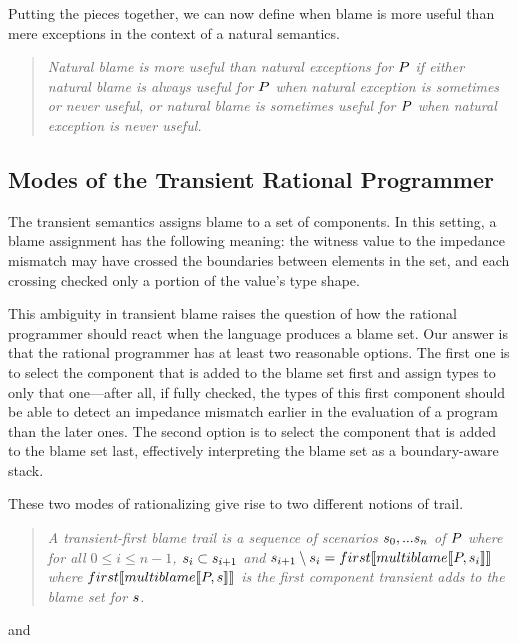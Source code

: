 Putting the pieces together, we can now define when blame 
is more useful than mere exceptions in the context of a natural semantics.
\begin{quote}
\it Natural blame  is more useful
  than natural exceptions for $P$ if either natural blame is
  always useful for $P$ when natural exception is sometimes or
  never useful, or natural blame is sometimes useful for $P$
  when natural exception is never useful.
\end{quote}



\subsection{Modes of the Transient Rational Programmer} \label{sub:transient}

The transient semantics assigns blame to a set of components. In this setting, a
blame assignment has the following meaning: the witness value to the impedance
mismatch may have crossed the boundaries between elements in the set, and each crossing
checked only a portion of the value's type shape. 

This ambiguity in transient blame raises the question of how the rational programmer
should react when the language produces a blame set. Our answer is that the rational
programmer has at least two reasonable options. The first one is to select the component that is added
to the blame set first and assign types to only that one---after all, if
fully checked, the types of
this first component should be able to detect an impedance mismatch earlier in the
evaluation of a program than the later ones. The second option is to
select the component that is added to the blame set last, effectively
interpreting the blame set as a boundary-aware stack. 

These two modes of rationalizing give rise to two different notions of trail.
\begin{quote}
\it A \emph{transient-first blame trail} is a sequence of scenarios
$s_0,...s_n$ of $P$ where for all $0 \leq i \leq n - 1$,
$s_i \subset s_{i+1}$ and $s_{i+1} \setminus s_i =
first\llbracket multiblame\llbracket P, s_i\rrbracket\rrbracket$ where $first\llbracket multiblame\llbracket P, s\rrbracket\rrbracket$ is the
first component transient adds to the blame set for $s$.
\end{quote}

and 

